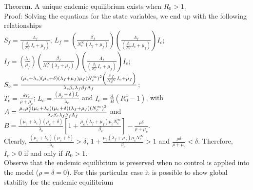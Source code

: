 \documentclass[preprint,12pt]{elsarticle}
\begin{document}
Theorem. A unique endemic equilibrium exists when $R_0>1$.\\
Proof: Solving the equations for the state variables, we end up with the 
following relationships
\\
$
    S_f=
        \frac{\Lambda_f}{
            \left(
                \frac{\beta_f}{N_c^{\infty}}I_c+\mu_f
            \right)
        }
$;
%
$
    L_f=
        \left(
            \frac{\beta_f}{N_c^{\infty}(\lambda_f+\mu_f)}
        \right)
        \left(
            \frac{\Lambda_f}{\left(\frac{\beta_f}{N_c^{\infty}}I_c+\mu_f\right)}
        \right)
        I_c
$;
\\
$
    I_f=
        \left(
            \frac{\lambda_f}{\mu_f}
       \right)
       \left(
        \frac{\beta_f}{N_c^{\infty}(\lambda_f+\mu_f)}
       \right)
       \left(
            \frac{\Lambda_f}{\left(\frac{\beta_f}{N_c^{\infty}}I_c+\mu_f\right)}
      \right) I_c
$;
$
    S_c=
        \frac{
            (\mu_c + \lambda_c)
            (\mu_c + \delta)
            (\lambda_f + \mu_f)
            \mu_f (N_c ^ {\infty}) ^ 2
            \left(
                \frac{\beta_f}{N_c ^ {\infty}} I_c
                 + \mu_f
            \right)
        }{%
            \lambda_c \beta_c \lambda_f \beta_f \Lambda_f
        }%
$;
\\
$
    T_c=\frac{\delta T_c}{\rho+\mu_c}
$;
$
    L_c=\frac{(\mu_c+\delta)I_c}{\lambda_c}
$ and
$
    I_c=\frac{A}{B}\left(R_0^4-1\right)
$,
with\\
$
    A=
        \frac{
            \mu_c \mu_f ^ 2
            (\mu_c + \lambda_c)
            (\mu_c + \delta)
            (\lambda_f + \mu_f)
            (N_c^{\infty}) ^ 2
        }{%
            \lambda_c 
            \beta_c 
            \lambda_f 
            \beta_f 
            \Lambda_f
        }
$ and 
$B=\frac{(\mu_c+\lambda_c)(\mu_c+\delta)}{\lambda_c}\left[1+{\frac{\mu_c(\lambda_f+\mu_f)\mu_cN_c^{\infty}}{\beta_c}}\right]-\frac{\rho\delta}{\rho+\mu_c}$.\\
Clearly, $\frac{(\mu_c+\lambda_c)(\mu_c+\delta)}{\lambda_c}>\delta$, $1+{\frac{\mu_c(\lambda_f+\mu_f)\mu_c N_c^{\infty}}{\beta_c}}>1$ and $\frac{\rho\delta}{\rho+\mu_c}<\delta$. Therefore, $I_c>0$ if and only if $R_0>1$.\\

\noindent Observe that the endemic equilibrium is preserved when no control is applied into the model ($\rho=\delta=0$). For this particular case it is possible to show global stability for the endemic equilibrium\\
\end{document}
